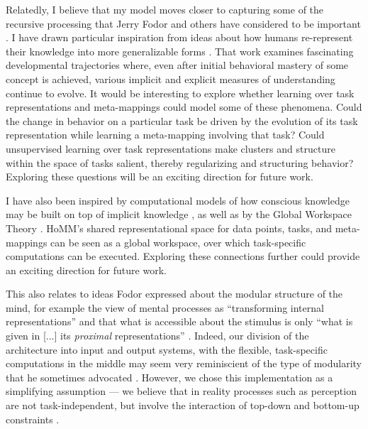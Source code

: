 Relatedly, I believe that my model moves closer to capturing some of the recursive processing that Jerry Fodor and others have considered to be important \citep[e.g.][]{Fodor2008lot2}. I have drawn particular inspiration from ideas about how humans re-represent their knowledge into more generalizable forms \citep{Karmiloff-Smith1986,Clark1993}. That work examines fascinating developmental trajectories where, even after initial behavioral mastery of some concept is achieved, various implicit and explicit measures of understanding continue to evolve. It would be interesting to explore whether learning over task representations and meta-mappings could model some of these phenomena. Could the change in behavior on a particular task be driven by the evolution of its task representation while learning a meta-mapping involving that task? Could unsupervised learning over task representations make clusters and structure within the space of tasks salient, thereby regularizing and structuring behavior? Exploring these questions will be an exciting direction for future work. \par 

I have also been inspired by computational models of how conscious knowledge may be built on top of implicit knowledge \citep{Cleeremans2014}, as well as by the Global Workspace Theory \citep{Baars2005}. HoMM's shared representational space for data points, tasks, and meta-mappings can be seen as a global workspace, over which task-specific computations can be executed. Exploring these connections further could provide an exciting direction for future work. \par

This also relates to ideas Fodor expressed about the modular structure of the mind, for example the view of mental processes as ``transforming internal representations'' and that what is accessible about the stimulus is only ``what is given in [...] its \emph{proximal} representations'' \citep[][pp. 200-201]{fodor1975language}. Indeed, our division of the architecture into input and output systems, with the flexible, task-specific computations in the middle may seem very reminiscient of the type of modularity that he sometimes advocated \citep{fodor1983modularity}. However, we chose this implementation as a simplifying assumption --- we believe that in reality processes such as perception are not task-independent, but involve the interaction of top-down and bottom-up constraints \citep{McClelland2014}. \par


